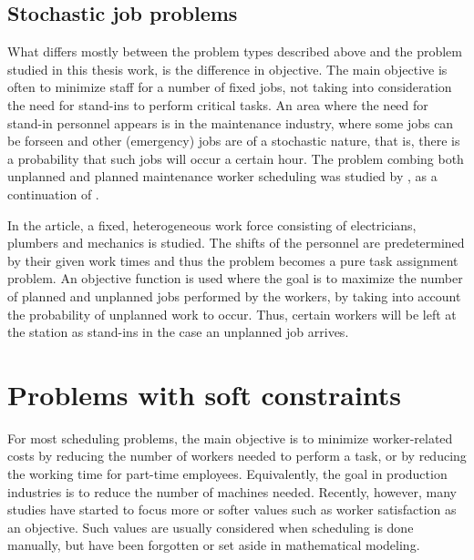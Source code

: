%


\subsection{Stochastic job problems}
What differs mostly between the problem types described above and the problem studied in this thesis work, is the difference in objective. The main objective is often to minimize staff for a number of fixed jobs, not taking into consideration the need for stand-ins to perform critical tasks. An area where the need for stand-in personnel appears is in the  maintenance industry, where some jobs can be forseen and other (emergency) jobs are of a stochastic nature, that is, there is a probability that such jobs will occur a certain hour. The problem combing both unplanned and planned maintenance worker scheduling was studied by \citet{duffuaa_1999}, as a continuation of \citet{roberts_1983}. 

In the article, a fixed, heterogeneous work force consisting of electricians, plumbers and mechanics is studied. The shifts of the personnel are predetermined by their given work times and thus the problem becomes a pure task assignment problem. An objective function is used where the goal is to maximize the number of planned and unplanned jobs performed by the workers, by taking into account the probability of unplanned work to occur. Thus, certain workers will be left at the station as stand-ins in the case an unplanned job arrives.


\section{Problems with soft constraints} \label{WLA}
For most scheduling problems, the main objective is to minimize worker-related costs by reducing the number of workers needed to perform a task, or by reducing the working time for part-time employees. Equivalently, the goal in production industries is to reduce the number of machines needed. Recently, however, many studies have started to focus more or softer values such as worker satisfaction as an objective. Such values are usually considered when scheduling is done manually, but have been forgotten or set aside in mathematical modeling.


